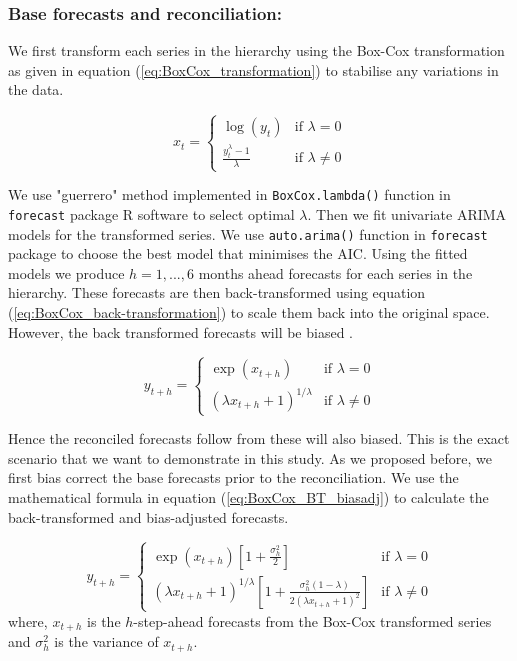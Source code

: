 \documentclass[12pt]{article}
\theoremstyle{definition}
\theoremstyle{property}
\begin{document}
	\subsubsection*{Base forecasts and reconciliation:}
	
	We first transform each series in the hierarchy using the Box-Cox transformation as given in equation (\ref{eq:BoxCox_transformation}) to stabilise any variations in the data. 
		
	\begin{equation} \label{eq:BoxCox_transformation}
	x_t = 
	\begin{cases} 
	\log(y_t) & \text{if } \lambda = 0 \\
	\frac{y_t^\lambda - 1}{\lambda}  & \text{if } \lambda \ne 0
	\end{cases}
	\end{equation}
	
	We use "guerrero" method \citep{guerrero1993time} implemented in \verb|BoxCox.lambda()| function in \verb|forecast| package R software \citep{Rforecast} to select optimal $\lambda$. Then  we fit univariate ARIMA models for the transformed series. We use \verb|auto.arima()| function in \verb|forecast| package to choose the best model that minimises the AIC. Using the fitted models we produce $h=1,...,6$ months ahead forecasts for each series in the hierarchy. These forecasts are then back-transformed using equation (\ref{eq:BoxCox_back-transformation}) to scale them back into the original space. However, the back transformed forecasts will be biased \citep{FPP2018}. 
	
	\begin{equation} \label{eq:BoxCox_back-transformation}
	y_{t+h} = 
	\begin{cases} 
	\exp({x_{t+h}}) & \text{if } \lambda = 0 \\
	(\lambda x_{t+h} + 1)^{1/\lambda}  & \text{if } \lambda \ne 0
	\end{cases}
	\end{equation}
	
	
	Hence the reconciled forecasts follow from these will also biased. This is the exact scenario that we want to demonstrate in this study. As we proposed before, we first bias correct the base forecasts prior to the reconciliation. We use the mathematical formula in equation (\ref{eq:BoxCox_BT_biasadj}) to calculate the back-transformed and bias-adjusted forecasts.
	
	\begin{equation} \label{eq:BoxCox_BT_biasadj}
	 y_{t+h} = 
	\begin{cases} 
	\exp({x_{t+h}})[1+\frac{\sigma_h^2}{2}] & \text{if } \lambda = 0 \\
	(\lambda x_{t+h} + 1)^{1/\lambda}[1 + \frac{\sigma_h^2(1-\lambda)}{2(\lambda x_{t+h} + 1)^2}]       & \text{if } \lambda \ne 0
	\end{cases}
	\end{equation}
	where, $x_{t+h}$ is the $h$-step-ahead forecasts from the Box-Cox transformed series and $\sigma_h^2$ is the variance of $x_{t+h}$. 
	
\end{document}
